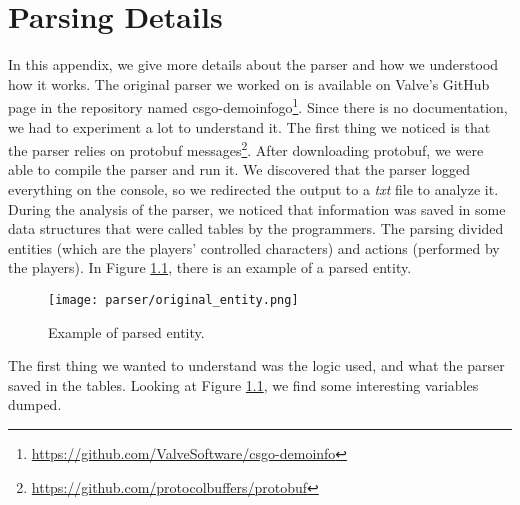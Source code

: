 
\chapter{Parsing Details\label{app:par}}

	In this appendix, we give more details about the parser and how we understood how it works. 
	The original parser we worked on is available on Valve's GitHub page in the repository named csgo-demoinfogo\footnote{\href{https://github.com/ValveSoftware/csgo-demoinfo}{https://github.com/ValveSoftware/csgo-demoinfo}}.
	Since there is no documentation, we had to experiment a lot to understand it. 
	The first thing we noticed is that the parser relies on protobuf messages\footnote{\href{https://github.com/protocolbuffers/protobuf}{https://github.com/protocolbuffers/protobuf}}. 
	After downloading protobuf, we were able to compile the parser and run it. 
	We discovered that the parser logged everything on the console, so we redirected the output to a \emph{txt} file to analyze it. 
	During the analysis of the parser, we noticed that information was saved in some data structures that were called tables by the programmers. 
	The parsing divided entities (which are the players' controlled characters) and actions (performed by the players).
	In Figure \ref{fig:ent}, there is an example of a parsed entity.
	
	\begin{figure}[!h] 
		\centering 
		\texttt{[image: parser/original\_entity.png]}
		\caption{\label{fig:ent}Example of parsed entity.}
	\end{figure}
	
	The first thing we wanted to understand was the logic used, and what the parser saved in the tables. 
	Looking at Figure \ref{fig:ent}, we find some interesting variables dumped. 
	
